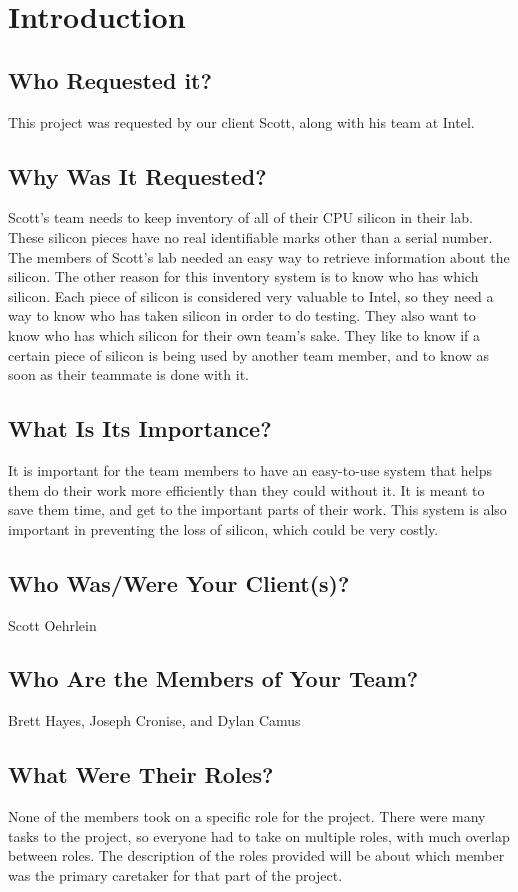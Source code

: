 \documentclass[10pt, onecolumn, twoside, peerreview]{IEEEtran}
\begin{document}
\section{Introduction} 

\subsection{Who Requested it?}
This project was requested by our client Scott, along with his team at Intel.

\subsection{Why Was It Requested?}
Scott's team needs to keep inventory of all of their CPU silicon in their lab. These silicon pieces have no real identifiable marks other than a serial number. The members of Scott's lab needed an easy way to retrieve information about the silicon. The other reason for this inventory system is to know who has which silicon. Each piece of silicon is considered very valuable to Intel, so they need a way to know who has taken silicon in order to do testing. They also want to know who has which silicon for their own team's sake. They like to know if a certain piece of silicon is being used by another team member, and to know as soon as their teammate is done with it.

\subsection{What Is Its Importance?}
It is important for the team members to have an easy-to-use system that helps them do their work more efficiently than they could without it. It is meant to save them time, and get to the important parts of their work. This system is also important in preventing the loss of silicon, which could be very costly.

\subsection{Who Was/Were Your Client(s)?}
Scott Oehrlein

\subsection{Who Are the Members of Your Team?}
Brett Hayes, Joseph Cronise, and Dylan Camus

\subsection{What Were Their Roles?}
None of the members took on a specific role for the project. There were many tasks to the project, so everyone had to take on multiple roles, with much overlap between roles. The description of the roles provided will be about which member was the primary caretaker for that part of the project.\\
\end{document}
